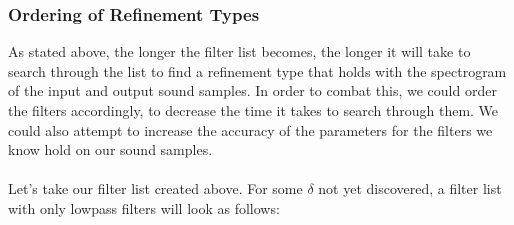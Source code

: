 \documentclass[english, 11pt]{article}
\begin{document}
\subsubsection{Ordering of Refinement Types}

As stated above, the longer the filter list becomes, the longer it will take to search through the list to find a refinement type that holds with the spectrogram of the input and output sound samples. In order to combat this, we could order the filters accordingly, to decrease the time it takes to search through them. We could also attempt to increase the accuracy of the parameters for the filters we know hold on our sound samples. \\ \\
Let's take our filter list created above. For some $\delta$ not yet discovered, a filter list with only lowpass filters will look as follows:
\end{document}
